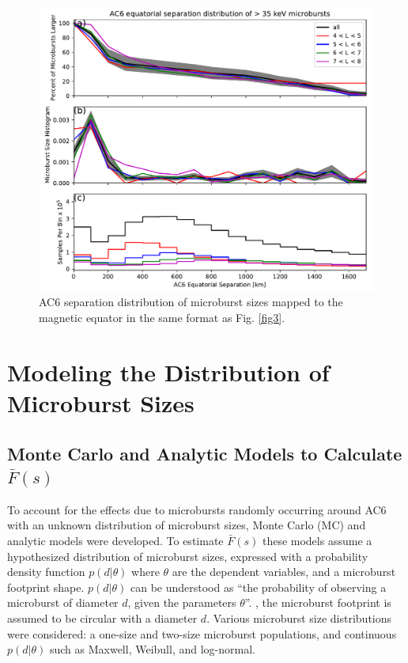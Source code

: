 \documentclass[draft]{agujournal2019}
\begin{document}
\begin{figure}
\includegraphics[width=\textwidth]{fig4.pdf}
\caption{AC6 separation distribution of microburst sizes mapped to the magnetic equator in the same format as Fig. \ref{fig3}.} 
\label{fig4}
\end{figure}

\section{Modeling the Distribution of Microburst Sizes} \label{model_section}
\subsection{Monte Carlo and Analytic Models to Calculate $\bar{F}(s)$}

To account for the effects due to microbursts randomly occurring around AC6 with an unknown distribution of microburst sizes, Monte Carlo (MC) and analytic models were developed. To estimate $\bar{F}(s)$ these models assume a hypothesized distribution of microburst sizes, expressed with a probability density function $p(d | \theta)$ where $\theta$ are the dependent variables, and a microburst footprint shape. $p(d | \theta)$ can be understood as ``the probability of observing a microburst of diameter $d$, given the parameters $\theta$''. , the microburst footprint is assumed to be circular with a diameter $d$. Various microburst size distributions were considered: a one-size and two-size microburst populations, and continuous $p(d | \theta)$ such as Maxwell, Weibull, and log-normal.
\end{document}
